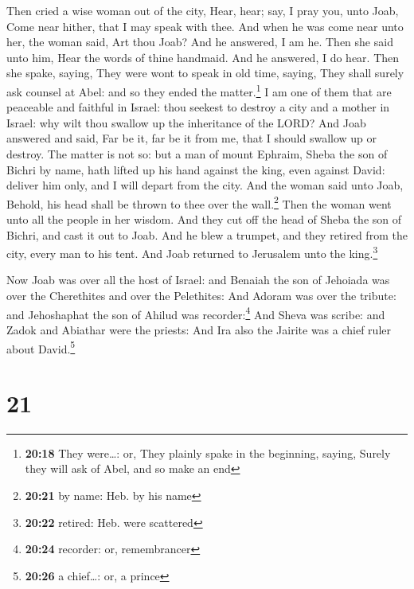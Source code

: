 Then cried a wise woman out of the city, Hear, hear;
say, I pray you, unto Joab, Come near hither, that I may speak with
thee.  And when he was come near unto her, the woman
said, Art thou Joab? And he answered, I am he. Then she said unto him,
Hear the words of thine handmaid. And he answered, I do hear.
 Then she spake, saying, They were wont to speak in old
time, saying, They shall surely ask counsel at Abel: and so they ended
the matter.\footnote{\textbf{20:18} They were\ldots: or, They plainly
  spake in the beginning, saying, Surely they will ask of Abel, and so
  make an end}  I am one of them that are peaceable and
faithful in Israel: thou seekest to destroy a city and a mother in
Israel: why wilt thou swallow up the inheritance of the LORD?
 And Joab answered and said, Far be it, far be it from
me, that I should swallow up or destroy.  The matter is
not so: but a man of mount Ephraim, Sheba the son of Bichri by name,
hath lifted up his hand against the king, even against David: deliver
him only, and I will depart from the city. And the woman said unto Joab,
Behold, his head shall be thrown to thee over the wall.\footnote{\textbf{20:21}
  by name: Heb. by his name}  Then the woman went unto
all the people in her wisdom. And they cut off the head of Sheba the son
of Bichri, and cast it out to Joab. And he blew a trumpet, and they
retired from the city, every man to his tent. And Joab returned to
Jerusalem unto the king.\footnote{\textbf{20:22} retired: Heb. were
  scattered}

 Now Joab was over all the host of Israel: and Benaiah
the son of Jehoiada was over the Cherethites and over the Pelethites:
 And Adoram was over the tribute: and Jehoshaphat the son
of Ahilud was recorder:\footnote{\textbf{20:24} recorder: or,
  remembrancer}  And Sheva was scribe: and Zadok and
Abiathar were the priests:  And Ira also the Jairite was
a chief ruler about David.\footnote{\textbf{20:26} a chief\ldots: or, a
  prince}

\hypertarget{section-20}{%
\section{21}\label{section-20}}

